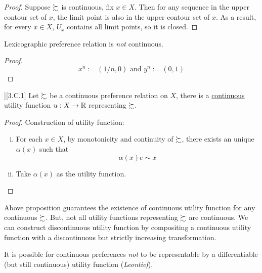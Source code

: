 \documentclass{article}
\begin{document}
 			\begin{proof}
 				Suppose $\succsim$ is continuous, fix $x \in X$. Then for any sequence in the upper contour set of $x$, the limit point is also in the upper contour set of $x$. As a result, for every $x \in X$, $U_x$ contains all limit points, so it is closed.
 			\end{proof}
 			
 			\begin{proposition}
 				Lexicographic preference relation is \emph{not} continuous.
 			\end{proposition}
 			
 			\begin{proof}
 				\begin{equation}
 					x^{n}:=(1 / n, 0) \text { and } y^{n}:=(0,1)
 				\end{equation}
 			\end{proof}
 			
 			\begin{proposition}][3.C.1]
 				Let $\succsim$ be a continuous preference relation on $X$, there is a \ul{continuous} utility function $u: X \to \mathbb{R}$ representing $\succsim$.
 			\end{proposition}
 			
 			\begin{proof}
 				Construction of utility function:
 				\begin{enumerate}[(i)]
 					\item For each $x \in X$, by monotonicity and continuity of $\succsim$, there exists an unique $\alpha(x)$ such that 
 					\begin{equation}
 						\alpha(x) e \sim x
 					\end{equation}
 					\item Take $\alpha(x)$ as the utility function.
 				\end{enumerate}
 			\end{proof}
 			
 			\begin{remark}
 				Above proposition guarantees the existence of continuous utility function for any continuous $\succsim$. But, not all utility functions representing $\succsim$ are continuous. We can construct discontinuous utility function by compositing a continuous utility function with a discontinuous but strictly increasing transformation.
 			\end{remark}
 			
 			\begin{remark}
 				It is possible for continuous preferences \emph{not} to be representable by a differentiable (but still continuous) utility function (\emph{Leontief}).
 			\end{remark}
 			
\end{document}
